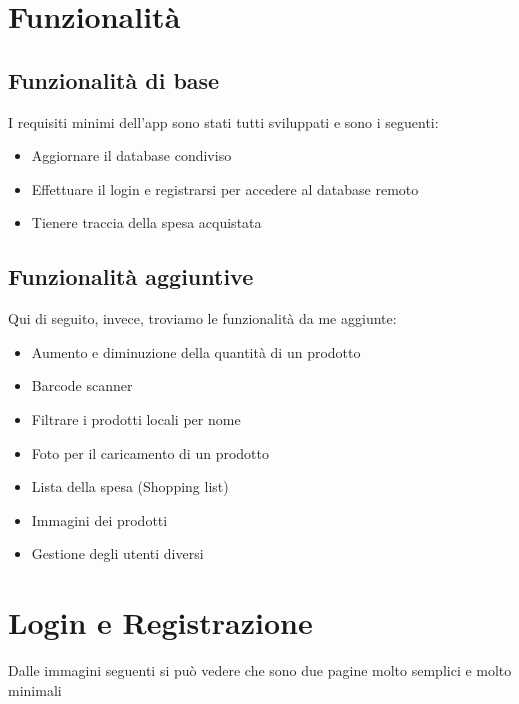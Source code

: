 \documentclass[11pt]{article}
\begin{document}
\section{Funzionalità}
\subsection{Funzionalità di base}
I requisiti minimi dell'app sono stati tutti sviluppati e sono i seguenti:
\begin{itemize}
\item Aggiornare il database condiviso
\item Effettuare il login e registrarsi per accedere al database remoto
\item Tienere traccia della spesa acquistata
\end{itemize}

\subsection{Funzionalità aggiuntive}
Qui di seguito, invece, troviamo le funzionalità da me aggiunte:
\begin{itemize}
\item Aumento e diminuzione della quantità di un prodotto
\item Barcode scanner
\item Filtrare i prodotti locali per nome
\item Foto per il caricamento di un prodotto
\item Lista della spesa (Shopping list)
\item Immagini dei prodotti
\item Gestione degli utenti diversi
\end{itemize}

\section{Login e Registrazione}
Dalle immagini seguenti si può vedere che sono due pagine molto semplici e molto minimali
\end{document}

